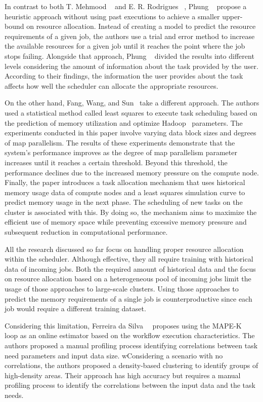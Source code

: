 In contrast to both T. Mehmood \etal~\cite{mehmood2018} and E. R. Rodrigues \etal~\cite{rodrigues2016}, Phung \etal~\cite{phung2021} propose a heuristic approach without using past executions to achieve a smaller upper-bound on resource allocation.
Instead of creating a model to predict the resource requirements of a given job, the authors use a trial and error method to increase the available resources for a given job until it reaches the point where the job stops failing.
Alongside that approach,  Phung \etal~\cite{phung2021} divided the results into different levels considering the amount of information about the task provided by the user.
According to their findings, the information the user provides about the task affects how well the scheduler can allocate the appropriate resources.

On the other hand, Fang, Wang, and Sun~\cite{fang2018} take a different approach.
The authors used a statistical method called least squares to execute task scheduling based on the prediction of memory utilization and optimize Hadoop~\cite{hadoop} parameters.
The experiments conducted in this paper involve varying data block sizes and degrees of map parallelism.
The results of these experiments demonstrate that the system's performance improves as the degree of map parallelism parameter increases until it reaches a certain threshold.
Beyond this threshold, the performance declines due to the increased memory pressure on the compute node.
Finally, the paper introduces a task allocation mechanism that uses historical memory usage data of compute nodes and a least squares simulation curve to predict memory usage in the next phase.
The scheduling of new tasks on the cluster is associated with this.
By doing so, the mechanism aims to maximize the efficient use of memory space while preventing excessive memory pressure and subsequent reduction in computational performance.

All the research discussed so far focus on handling proper resource allocation within the scheduler.
Although effective, they all require training with historical data of incoming jobs.
Both the required amount of historical data and the focus on resource allocation based on a heterogeneous pool of incoming jobs limit the usage of those approaches to large-scale clusters.
Using those approaches to predict the memory requirements of a single job is counterproductive since each job would require a different training dataset.

Considering this limitation, Ferreira da Silva~\etal~\cite{ferreira2013} proposes using the \ac{MAPE-K}~\cite{mapek} loop as an online estimator based on the workflow execution characteristics.
The authors proposed a manual profiling process identifying correlations between task need parameters and input data size.
wConsidering a scenario with no correlations, the authors proposed a density-based clustering to identify groups of high-density areas.
Their approach has high accuracy but requires a manual profiling process to identify the correlations between the input data and the task needs.

